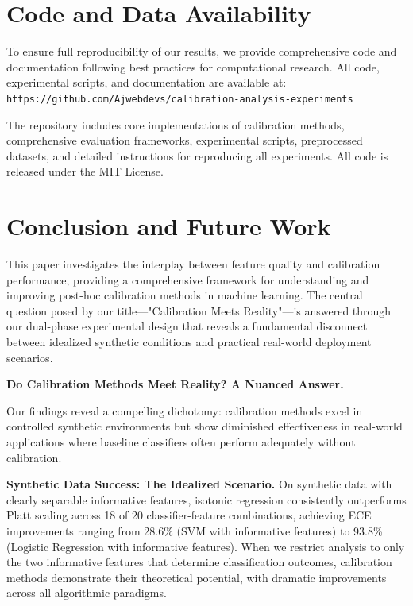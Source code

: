 \documentclass[12pt, a4paper]{article}
\begin{document}

\section{Code and Data Availability}\label{sec:CodeandDataAvailability}

To ensure full reproducibility of our results, we provide comprehensive code and documentation following best practices for computational research. All code, experimental scripts, and documentation are available at: \texttt{https://github.com/Ajwebdevs/calibration-analysis-experiments}

The repository includes core implementations of calibration methods, comprehensive evaluation frameworks, experimental scripts, preprocessed datasets, and detailed instructions for reproducing all experiments. All code is released under the MIT License.


\section{Conclusion and Future Work}\label{sec:ConclusionandFutureWork}

This paper investigates the interplay between feature quality and calibration performance, providing a comprehensive framework for understanding and improving post-hoc calibration methods in machine learning. The central question posed by our title—"Calibration Meets Reality"—is answered through our dual-phase experimental design that reveals a fundamental disconnect between idealized synthetic conditions and practical real-world deployment scenarios.

\textbf{Do Calibration Methods Meet Reality? A Nuanced Answer.}

Our findings reveal a compelling dichotomy: calibration methods excel in controlled synthetic environments but show diminished effectiveness in real-world applications where baseline classifiers often perform adequately without calibration.

\textbf{Synthetic Data Success: The Idealized Scenario.} On synthetic data with clearly separable informative features, isotonic regression consistently outperforms Platt scaling across 18 of 20 classifier-feature combinations, achieving ECE improvements ranging from 28.6\% (SVM with informative features) to 93.8\% (Logistic Regression with informative features). When we restrict analysis to only the two informative features that determine classification outcomes, calibration methods demonstrate their theoretical potential, with dramatic improvements across all algorithmic paradigms.
\end{document}
